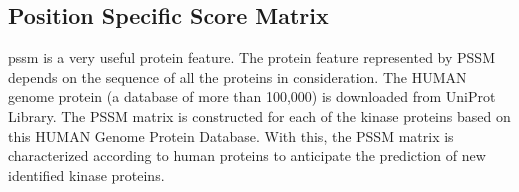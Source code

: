 \subsection{Position Specific Score Matrix}

\acrfull{pssm} is a very useful protein feature. The protein feature represented by PSSM depends on the sequence of all the proteins in consideration. The HUMAN genome protein (a database of more than 100,000) is downloaded from UniProt Library. The PSSM matrix is constructed for each of the kinase proteins based on this HUMAN Genome Protein Database. With this, the PSSM matrix is characterized according to human proteins to anticipate the prediction of new identified kinase proteins.

\begin{table}
  \centering
  {\caption{PSSM Analysis Design}
  \label{table:PSSM_Analysis} }
\end{table}
